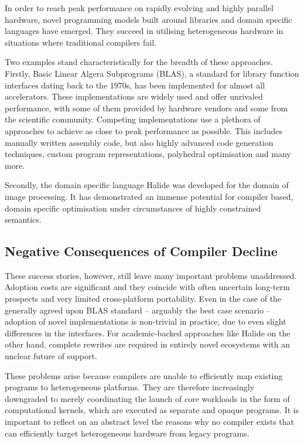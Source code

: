     In order to reach peak performance on rapidly evolving and highly parallel
    hardware, novel programming models built around libraries and domain
    specific languages have emerged.
    They succeed in utilising heterogeneous hardware in situations where
    traditional compilers fail.

    Two examples stand characteristically for the breadth of these approaches.
    Firstly, Basic Linear Algera Subprograms (BLAS), a standard for library
    function interfaces dating back to the 1970s, has been implemented for
    almost all accelerators.
    These implementations are widely used and offer unrivaled performance, with
    some of them provided by hardware vendors and some from the scientific
    community.
    Competing implementations use a plethora of approaches to achieve as close
    to peak performance as possible.
    This includes manually written assembly code, but also highly advanced
    code generation techniques, custom program representations, polyhedral
    optimisation and many more.

    Secondly, the domain specific language Halide was developed for the domain
    of image processing.
    It has demonstrated an immense potential for compiler based, domain specific
    optimisation under circumstances of highly constrained semantics.

\subsection{Negative Consequences of Compiler Decline}

    These success stories, however, still leave many important problems
    unaddressed.
    Adoption costs are significant and they coincide with often uncertain
    long-term prospects and very limited cross-platform portability.
    Even in the case of the generally agreed upon BLAS standard -- arguably the
    best case scenario -- adoption of novel implementations is non-trivial in
    practice, due to even slight differences in the interfaces.
    For academic-backed approaches like Halide on the other hand, complete
    rewrites are required in entirely novel ecosystems with an unclear future of
    support.

    These problems arise because compilers are unable to efficiently map
    existing programs to heterogeneous platforms.
    They are therefore increasingly downgraded to merely coordinating the launch
    of core workloads in the form of computational kernels, which are
    executed as separate and opaque programs.
    It is important to reflect on an abstract level the reasons why no compiler
    exists that can efficiently target heterogeneous hardware from legacy
    programs.

